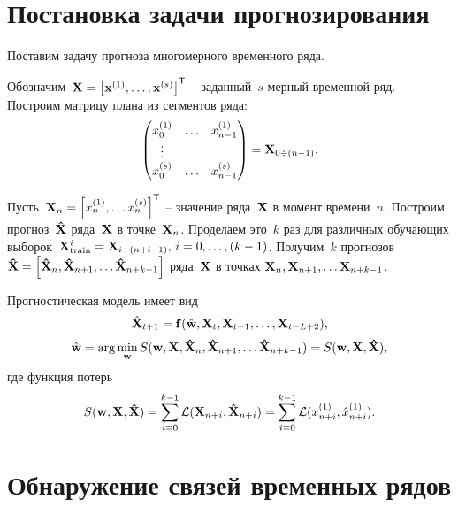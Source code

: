 \documentclass[14pt]{article}
\begin{document}
 




\section{Постановка задачи прогнозирования} 
Поставим задачу прогноза многомерного временного ряда.

Обозначим~${\bf X} = \left[{\bf x}^{(1)}, \ldots ,{\bf x}^{(s)}\right]^{\mathsf{T}}$ -- заданный~$s$-мерный временной ряд. 
Построим матрицу плана из сегментов ряда:
\begin{equation}\label{X_multidim}
\begin{pmatrix}
x^{(1)}_{0} & \ldots & x^{(1)}_{n - 1} \\ 
\vdots \\ 
x^{(s)}_{0} & \ldots & x^{(s)}_{n - 1}
\end{pmatrix} = {\bf X}_{0 \div (n - 1)}.
\end{equation}

Пусть~${\bf X}_n = \left[ x^{(1)}_n, \ldots x^{(s)}_n\right]^{\mathsf{T}}$ -- значение ряда~${\bf X}$ в момент времени~$n$.
Построим прогноз~${\bf \hat{X}}$ ряда~${\bf X}$ в точке~${\bf X}_{n}$. Проделаем это~$k$ раз для различных обучающих выборок~${\bf X}_{\text{train}}^i = {\bf X}_{i \div (n + i - 1)}, \, {i = 0, \ldots, (k - 1)}$.
Получим~$k$ прогнозов ${\bf \hat{X}} = \left[{\bf \hat{X}}_n, {\bf \hat{X}}_{n + 1}, \ldots {\bf \hat{X}}_{n + k - 1} \right]$ ряда~${\bf X}$ в точках ${\bf X}_n, {\bf X}_{n + 1}, \ldots {\bf X}_{n + k - 1}$.

Прогностическая модель имеет вид
$$\hat{{\bf X}}_{t + 1} = {\bf f}(\hat{\textbf{w}}, {\bf X}_t, {\bf X}_{t-1}, \ldots, {\bf X}_{t - L + 2}),$$ 
$$\hat{\textbf{w}} = \text{arg}\min_{\textbf{w}}{S(\textbf{w}, {\bf X}, {\bf \hat{X}}_n, {\bf \hat{X}}_{n + 1}, \ldots {\bf \hat{X}}_{n + k - 1} )} = 
{S(\textbf{w}, {\bf X}, {\bf \hat{X}})},$$
где функция потерь 
$$S(\textbf{w}, {\bf X}, {\bf \hat{X}}) = \sum_{i = 0}^{k - 1}{\mathcal{L}({\bf X}_{n + i}, {\bf \hat{X}}_{n + i})} = \sum_{i = 0}^{k - 1}{\mathcal{L}({x}^{(1)}_{n + i}, {\hat{x}}^{(1)}_{n + i})}.$$


\section{Обнаружение связей временных рядов}\label{granger_test}
\end{document}
